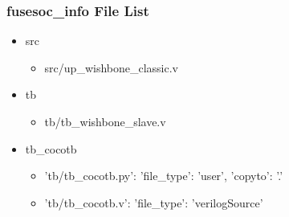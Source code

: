 \subsubsection{fusesoc\_info File List}
\begin{itemize}
\item src
	\begin{itemize}
	\item src/up\_wishbone\_classic.v
	\end{itemize}
\item tb
	\begin{itemize}
	\item tb/tb\_wishbone\_slave.v
	\end{itemize}
\item tb\_cocotb
	\begin{itemize}
	\item {'tb/tb\_cocotb.py': {'file\_type': 'user', 'copyto': '.'}}
	\item {'tb/tb\_cocotb.v': {'file\_type': 'verilogSource'}}
	\end{itemize}
\end{itemize}
